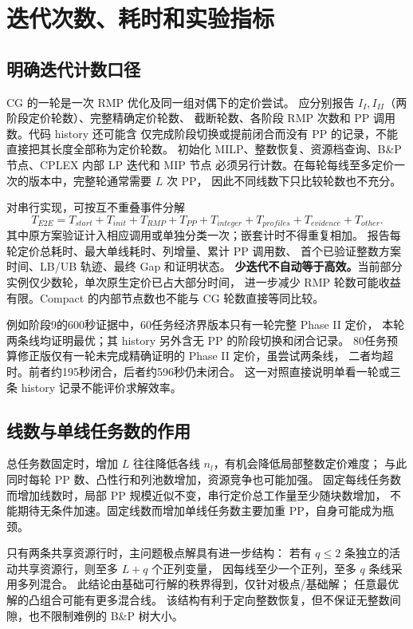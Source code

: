 \documentclass[UTF8,a4paper,11pt]{ctexart}
\begin{document}
\section{迭代次数、耗时和实验指标}
\subsection{明确迭代计数口径}
CG 的一轮是一次 RMP 优化及同一组对偶下的定价尝试。
应分别报告 $I_I,I_{II}$（两阶段定价轮数）、完整精确定价轮数、
截断轮数、各阶段 RMP 次数和 PP 调用数。代码 history 还可能含
仅完成阶段切换或提前闭合而没有 PP 的记录，不能直接把其长度全部称为定价轮数。
初始化 MILP、整数恢复、资源档查询、B\&P 节点、CPLEX 内部 LP 迭代和 MIP 节点
必须另行计数。在每轮每线至多定价一次的版本中，完整轮通常需要 $L$ 次 PP，
因此不同线数下只比较轮数也不充分。

对串行实现，可按互不重叠事件分解
\begin{equation}
T_{E2E}=T_{start}+T_{init}+T_{RMP}+T_{PP}
+T_{integer}+T_{profiles}+T_{evidence}+T_{other}.
\end{equation}
其中原方案验证计入相应调用或单独分类一次；嵌套计时不得重复相加。
报告每轮定价总耗时、最大单线耗时、列增量、累计 PP 调用数、
首个已验证整数方案时间、LB/UB 轨迹、最终 Gap 和证明状态。
\textbf{少迭代不自动等于高效。}当前部分实例仅少数轮，单次原生定价已占大部分时间，
进一步减少 RMP 轮数可能收益有限。Compact 的内部节点数也不能与 CG 轮数直接等同比较。

例如阶段9的600秒证据中，60任务经济界版本只有一轮完整 Phase II 定价，
本轮两条线均证明最优；其 history 另外含无 PP 的阶段切换和闭合记录。
80任务预算修正版仅有一轮未完成精确证明的 Phase II 定价，虽尝试两条线，
二者均超时。前者约195秒闭合，后者约596秒仍未闭合。
这一对照直接说明单看一轮或三条 history 记录不能评价求解效率。

\subsection{线数与单线任务数的作用}
总任务数固定时，增加 $L$ 往往降低各线 $n_l$，有机会降低局部整数定价难度；
与此同时每轮 PP 数、凸性行和列池数增加，资源竞争也可能加强。
固定每线任务数而增加线数时，局部 PP 规模近似不变，串行定价总工作量至少随块数增加，
不能期待无条件加速。固定线数而增加单线任务数主要加重 PP，自身可能成为瓶颈。

只有两条共享资源行时，主问题极点解具有进一步结构：
若有 $q\leq2$ 条独立的活动共享资源行，则至多 $L+q$ 个正列变量，
因每线至少一个正列，至多 $q$ 条线采用多列混合。
此结论由基础可行解的秩界得到，仅针对极点/基础解；
任意最优解的凸组合可能有更多混合线。
该结构有利于定向整数恢复，但不保证无整数间隙，也不限制难例的 B\&P 树大小。
\end{document}

